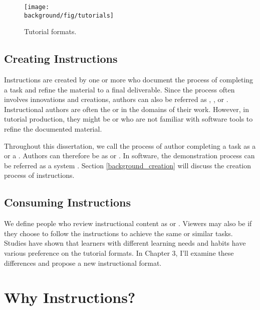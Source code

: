 \begin{figure*}[t]
  \centering
  \texttt{[image: \\background/fig/tutorials]}
  \caption{Tutorial formats. }
  \label{fig:background_format}
\end{figure*}

\subsection{Creating Instructions}
Instructions are created by one or more  who document the process of completing a task and refine the material to a final deliverable.
%
Since the process often involves innovations and creations, authors can also be referred as , , or .
%
Instructional authors are often the  or  in the domains of their work. However, in tutorial production, they might be  or  who are not familiar with software tools to refine the documented material.

Throughout this dissertation, we call the process of author completing a task as a  or a . Authors can therefore be as  or .
%
In software, the demonstration process can be referred as a system . Section \ref{background_creation} will discuss the creation process of instructions.

\subsection{Consuming Instructions}
We define people who review instructional content as  or . Viewers may also be  if they choose to follow the instructions to achieve the same or similar tasks.
%
Studies have shown that learners with different learning needs and habits have various preference on the tutorial formats. In Chapter 3, I'll examine these differences and propose a new instructional format.




\section{Why Instructions?}
\label{background_why}


